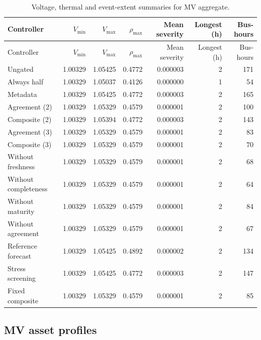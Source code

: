 \documentclass[11pt]{article}
\begin{document}
\small\begin{longtable}{lrrrrrr}
\caption{Voltage, thermal and event-extent summaries for MV aggregate.}\\\toprule
Controller & $V_{\min}$ & $V_{\max}$ & $\rho_{\max}$ & Mean severity & Longest (h) & Bus-hours\\\midrule
\endfirsthead
\toprule
Controller & $V_{\min}$ & $V_{\max}$ & $\rho_{\max}$ & Mean severity & Longest (h) & Bus-hours\\\midrule
\endhead
\bottomrule\endfoot
Ungated & 1.00329 & 1.05425 & 0.4772 & 0.000003 & 2 & 171\\
Always half & 1.00329 & 1.05037 & 0.4126 & 0.000000 & 1 & 54\\
Metadata & 1.00329 & 1.05425 & 0.4772 & 0.000003 & 2 & 165\\
Agreement (2) & 1.00329 & 1.05329 & 0.4579 & 0.000001 & 2 & 100\\
Composite (2) & 1.00329 & 1.05394 & 0.4772 & 0.000003 & 2 & 143\\
Agreement (3) & 1.00329 & 1.05329 & 0.4579 & 0.000001 & 2 & 83\\
Composite (3) & 1.00329 & 1.05329 & 0.4579 & 0.000001 & 2 & 70\\
Without freshness & 1.00329 & 1.05329 & 0.4579 & 0.000001 & 2 & 68\\
Without completeness & 1.00329 & 1.05329 & 0.4579 & 0.000001 & 2 & 64\\
Without maturity & 1.00329 & 1.05329 & 0.4579 & 0.000001 & 2 & 84\\
Without agreement & 1.00329 & 1.05329 & 0.4579 & 0.000001 & 2 & 67\\
Reference forecast & 1.00329 & 1.05425 & 0.4892 & 0.000002 & 2 & 134\\
Stress screening & 1.00329 & 1.05425 & 0.4772 & 0.000003 & 2 & 147\\
Fixed composite & 1.00329 & 1.05329 & 0.4579 & 0.000001 & 2 & 85\\
\end{longtable}\normalsize
{}\subsection{MV asset profiles}
\end{document}
